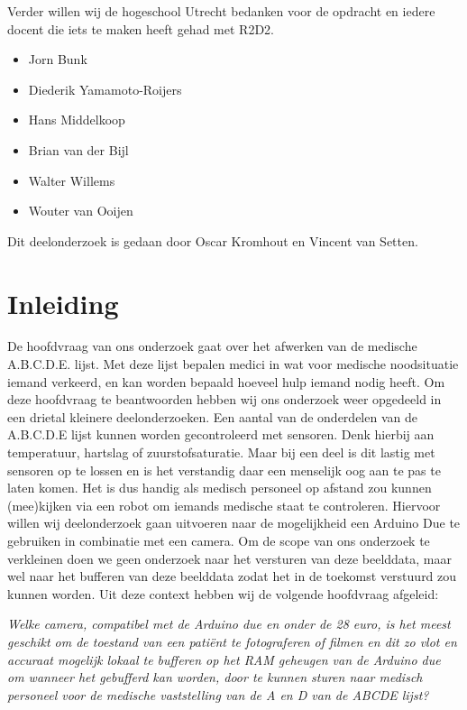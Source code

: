 \documentclass{article}
\begin{document}
Verder willen wij de hogeschool Utrecht bedanken voor de opdracht en iedere docent die iets te maken heeft gehad met R2D2.

\begin{itemize}
	\item Jorn Bunk
	\item Diederik Yamamoto-Roijers 
	\item Hans Middelkoop
	\item Brian van der Bijl 
	\item Walter Willems 
	\item Wouter van Ooijen
\end{itemize}

Dit deelonderzoek is gedaan door Oscar Kromhout en Vincent van Setten.

\section{Inleiding}
De hoofdvraag van ons onderzoek gaat over het afwerken van de medische A.B.C.D.E. lijst. Met deze lijst bepalen medici in wat voor medische noodsituatie iemand verkeerd, en kan worden bepaald hoeveel hulp iemand nodig heeft. Om deze hoofdvraag te beantwoorden hebben wij ons onderzoek weer opgedeeld in een drietal kleinere deelonderzoeken.  
Een aantal van de onderdelen van de A.B.C.D.E lijst kunnen worden gecontroleerd met sensoren. Denk hierbij aan temperatuur, hartslag of zuurstofsaturatie. Maar bij een deel is dit lastig met sensoren op te lossen en is het verstandig daar een menselijk oog aan te pas te laten komen. Het is dus handig als medisch personeel op afstand zou kunnen (mee)kijken via een robot om iemands medische staat te controleren. Hiervoor willen wij deelonderzoek gaan uitvoeren naar de mogelijkheid een Arduino Due te gebruiken in combinatie met een camera. Om de scope van ons onderzoek te verkleinen doen we geen onderzoek naar het versturen van deze beelddata, maar wel naar het bufferen van deze beelddata zodat het in de toekomst verstuurd zou kunnen worden. 
Uit deze context hebben wij de volgende hoofdvraag afgeleid: 

\textit{Welke camera, compatibel met de Arduino due en onder de 28 euro, is het meest geschikt om de toestand van een patiënt te fotograferen of filmen en dit zo vlot en accuraat mogelijk lokaal te bufferen op het RAM geheugen van de Arduino due om wanneer het gebufferd kan worden, door te kunnen sturen naar medisch personeel voor de medische vaststelling van de A en D van de ABCDE lijst?}
\end{document}
